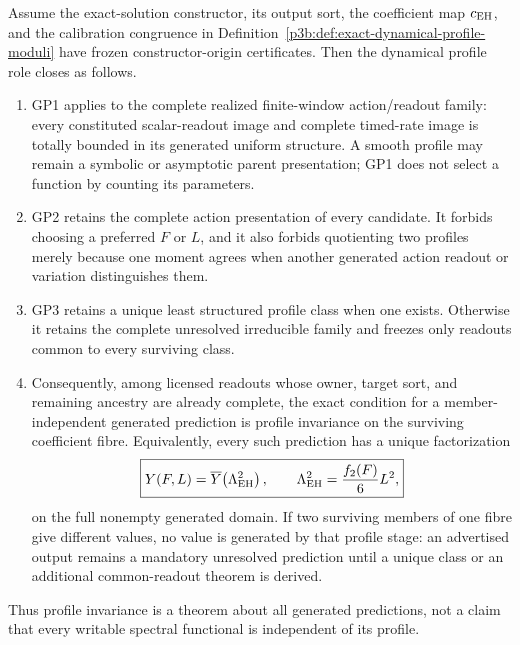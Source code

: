 \documentclass[12pt,a4paper]{article}
\begin{document}
\begin{theorem}
\label{p3b:thm:gp-profile-invariance-factorization}
Assume the exact-solution constructor, its output sort, the coefficient map
\(c_{\rm EH}\), and the calibration congruence in
Definition~\ref{p3b:def:exact-dynamical-profile-moduli} have frozen
constructor-origin certificates.  Then the dynamical profile role closes as
follows.
\begin{enumerate}[label=(\roman*),leftmargin=2.1em]
\item GP1 applies to the complete realized finite-window action/readout
      family: every constituted scalar-readout image and complete timed-rate
      image is totally bounded in its generated uniform structure.  A smooth
      profile may remain a symbolic or asymptotic parent presentation; GP1
      does not select a function by counting its parameters.
\item GP2 retains the complete action presentation of every candidate.  It
      forbids choosing a preferred \(F\) or \(L\), and it also forbids
      quotienting two profiles merely because one moment agrees when another
      generated action readout or variation distinguishes them.
\item GP3 retains a unique least structured profile class when one exists.
      Otherwise it retains the complete unresolved irreducible family and
      freezes only readouts common to every surviving class.
\item Consequently, among licensed readouts whose owner, target sort, and
      remaining ancestry are already complete, the exact condition for a
      member-independent generated prediction is profile invariance on the
      surviving coefficient fibre.  Equivalently, every such prediction has
      a unique factorization
      \begin{equation}
       \label{p3b:eq:profile-invariant-factorization}
       \boxed{Y(F,L)=\overline Y\!\left(\Lambda_{\rm EH}^{2}\right),
       \qquad
       \Lambda_{\rm EH}^{2}=\frac{f_2(F)}6L^2,}
      \end{equation}
      on the full nonempty generated domain.  If two surviving members of one
      fibre give different values, no value is generated by that profile
      stage: an advertised output remains a mandatory unresolved prediction
      until a unique class or an additional common-readout theorem is derived.
\end{enumerate}
Thus profile invariance is a theorem about all generated predictions, not a
claim that every writable spectral functional is independent of its profile.
\end{theorem}
\end{document}
